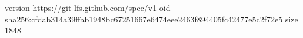 version https://git-lfs.github.com/spec/v1
oid sha256:cfdab314a39ffab1948bc67251667e6474eee2463f894405fc42477e5c2f72e5
size 1848
